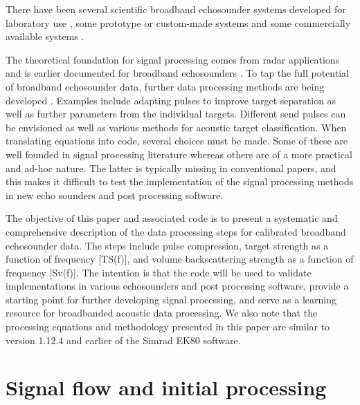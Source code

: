 \documentclass[preprint,12pt,TurnOnLineNumbers]{JASAnew}
\begin{document}
There have been several scientific broadband echosounder systems developed for laboratory use \citep{Conti2003Wide-bandwidth, Forland2014Scattering, chu1992}, some prototype or custom-made systems \citep{Zakharia1989Wide-band, Zakharia1996Wideband, Simmonds1996Species, Foote2005Measuring, Imaizumi2009Detection, Briseno-Avena2015ZOOPS, Barr2002Target} and some commercially available systems \citep{Gordon1998FishMASS, Zedel2003Acoustic, Stanton2010New, ehrenbergFMSlideChirp2000, dennyBroadbandAcousticFish1998}.

The theoretical foundation for signal processing comes from radar applications and is earlier documented for broadband echosounders \citep{stanton2008}. To tap the full potential of broadband echosounder data, further data processing methods are being developed \citep{lavery2017,bassett_broadband_2018}. Examples include adapting pulses to improve target separation as well as further parameters from the individual targets. Different send pulses can be envisioned as well as various methods for acoustic target classification. When translating equations into code, several choices must be made. Some of these are well founded in signal processing literature whereas others are of a more practical and ad-hoc nature. The latter is typically missing in conventional papers, and this makes it difficult to test the implementation of the signal processing methods in new echo sounders and post processing software.

The objective of this paper and associated code is to present a systematic and comprehensive description of the data processing steps for calibrated broadband echosounder data. The steps include pulse compression, target strength as a function of frequency [TS(f)], and volume backscattering strength as a function of frequency [Sv(f)]. The intention is that the code will be used to validate implementations in various echosounders and post processing software, provide a starting point for further developing signal processing, and serve as a learning resource for broadbanded acoustic data processing. We also note that the processing equations and methodology presented in this paper are similar to version 1.12.4 and earlier of the Simrad EK80 software. 

\section{Signal flow and initial processing}
\end{document}
